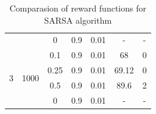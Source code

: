 \documentclass[a4paper, twoside, english]{article}
\begin{document}
\begin{table}[h!]
\begin{tabular}{ccccccc}
		&                        & 0                                    & 0.9                                & 0.01                               & -                                        & -                                   \\
		\multirow{4}{*}{3}                  & \multirow{4}{*}{1000}  & 0.1                                  & 0.9                                & 0.01                               & 68                                       & 0                                   \\
		&                        & 0.25                                 & 0.9                                & 0.01                               & 69.12                                    & 0                                   \\
		&                        & 0.5                                  & 0.9                                & 0.01                               & 89.6                                     & 2                                   \\
		&                        & 0                                    & 0.9                                & 0.01                               & -                                        & -                                  
	\end{tabular}
	\caption{Comparasion of reward functions for SARSA algorithm}
	\label{table:1}
\end{table}

\newpage
\end{document}
